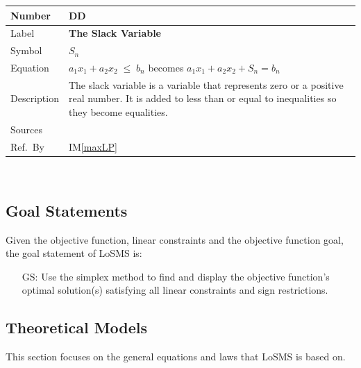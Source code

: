 \documentclass[12pt]{article}
\newcommand{\colAwidth}{0.13\textwidth}
\newcommand{\colBwidth}{0.82\textwidth}
\newcounter{defnum} %
\newcounter{datadefnum} %
\newcounter{goalnum} %
\newcommand{\iref}[1]{IM\ref{#1}}
\newcommand{\famname}{LoSMS} %
\begin{document}
\noindent
\begin{minipage}{\textwidth}
	\renewcommand*{\arraystretch}{1.5}
	\begin{tabular}{| p{\colAwidth} | p{\colBwidth}|}
		\hline
		\rowcolor[gray]{0.9}
		Number& DD{datadefnum}\thedatadefnum 
		\label{slackVar}\\
		\hline
		Label& \bf The Slack Variable\\
		\hline
		Symbol & $S_n$\\
		\hline
		Equation& $a_1x_1 + a_2x_2\;{\leq}\;b_n$ becomes $a_1x_1 + a_2x_2 + S_n 
		= b_n$ \\
		\hline
		Description & 
		The slack variable is a variable that represents zero or a positive 
		real number. It is added to less than or equal to inequalities so they 
		become equalities.
		\\
		\hline
		Sources& \cite{lp-defs}\\
		\hline
		Ref.\ By & \iref{maxLP}\\
		\hline
	\end{tabular}
\end{minipage}\\

\subsection{Goal Statements}

\noindent Given the objective function, linear constraints and the objective 
function goal, the goal statement of \famname{} is: 

\begin{itemize}
	\item[GS\refstepcounter{goalnum}\thegoalnum \label{goalStatement}:] Use the 
	simplex method to find and display the objective function's optimal 
	solution(s) satisfying all linear constraints and sign restrictions.
\end{itemize}

 

\subsection{Theoretical Models} \label{sec_theoretical}

This section focuses on the general equations and laws that \famname{} is based
on.
\end{document}
